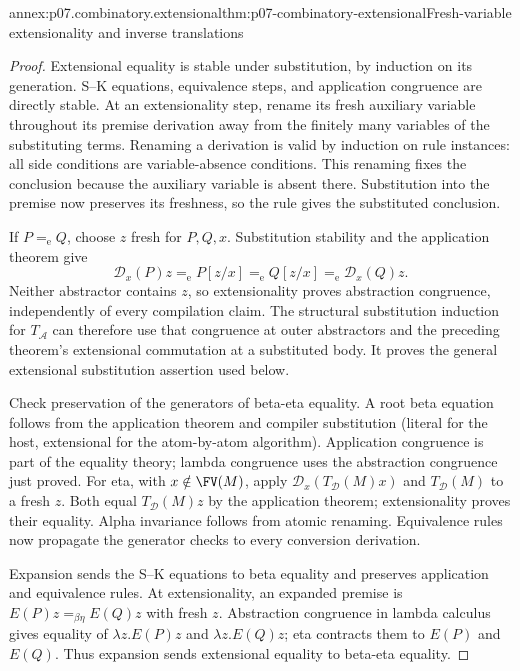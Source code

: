 \begin{annexitem}{annex:p07.combinatory.extensional}{thm:p07-combinatory-extensional}{Fresh-variable extensionality and inverse translations}
\begin{proof}
Extensional equality is stable under substitution, by induction on its
generation.  S--K equations, equivalence steps, and application congruence are
directly stable.  At an extensionality step, rename its fresh auxiliary variable
throughout its premise derivation away from the finitely many variables of the
substituting terms.  Renaming a derivation is valid by induction on rule instances:
all side conditions are variable-absence conditions.  This renaming fixes the
conclusion because the auxiliary variable is absent there.  Substitution into
the premise now preserves its freshness, so the rule gives the substituted
conclusion.

If \(P=_{\mathrm e}Q\), choose \(z\) fresh for \(P,Q,x\).
Substitution stability and the application theorem give
\[
 \mathcal D_x(P)z=_{\mathrm e}P[z/x]
   =_{\mathrm e}Q[z/x]=_{\mathrm e}\mathcal D_x(Q)z.
\]
Neither abstractor contains \(z\), so extensionality proves abstraction
congruence, independently of every compilation claim.
The structural substitution induction for \(T_{\mathcal A}\) can therefore
use that congruence at outer abstractors and the preceding theorem's
extensional commutation at a substituted body.  It proves the general
extensional substitution assertion used below.

Check preservation of the generators of beta-eta equality.  A root beta
equation follows from the application theorem and compiler substitution
(literal for the host, extensional for the atom-by-atom algorithm).
Application congruence is part of the equality theory; lambda congruence uses
the abstraction congruence just proved.  For eta, with \(x\notin\FV(M)\),
apply \(\mathcal D_x(T_{\mathcal D}(M)x)\) and \(T_{\mathcal D}(M)\) to a
fresh \(z\).  Both equal \(T_{\mathcal D}(M)z\) by the application theorem;
extensionality proves their equality.  Alpha invariance follows from atomic
renaming.  Equivalence rules now propagate the generator checks to every
conversion derivation.

Expansion sends the S--K equations to beta equality and preserves application
and equivalence rules.  At extensionality, an expanded premise is
\(E(P)z=_{\beta\eta}E(Q)z\) with fresh \(z\).  Abstraction congruence in
lambda calculus gives equality of \(\lambda z.E(P)z\) and
\(\lambda z.E(Q)z\); eta contracts them to \(E(P)\) and \(E(Q)\).
Thus expansion sends extensional equality to beta-eta equality.


\end{proof}
\end{annexitem}
